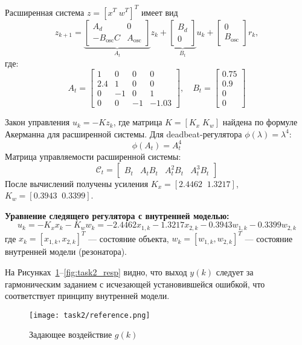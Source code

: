 Расширенная система $z=[x^T\; w^T]^T$ имеет вид
\[
 z_{k+1}= \underbrace{\begin{bmatrix} A_d & 0\\ -B_{\text{osc}} C & A_{\text{osc}}\end{bmatrix}}_{A_t} z_k + \underbrace{\begin{bmatrix} B_d \\ 0 \end{bmatrix}}_{B_t} u_k + \begin{bmatrix}0\\ B_{\text{osc}}\end{bmatrix} r_k,
\]
где:
\[
A_t = \begin{bmatrix}
1 & 0 & 0 & 0\\
2.4 & 1 & 0 & 0\\
0 & -1 & 0 & 1\\
0 & 0 & -1 & -1.03
\end{bmatrix},\quad B_t = \begin{bmatrix}0.75\\ 0.9\\ 0\\ 0\end{bmatrix}
\]

Закон управления $u_k=-K z_k$, где матрица $K=[K_x\;K_w]$ найдена по формуле Акерманна для расширенной системы. Для deadbeat-регулятора $\phi(\lambda)=\lambda^4$:
\[
\phi(A_t) = A_t^4
\]
Матрица управляемости расширенной системы:
\[
\mathcal C_t = \begin{bmatrix}B_t & A_t B_t & A_t^2 B_t & A_t^3 B_t\end{bmatrix}
\]
После вычислений получены усиления $K_x=[2.4462\;\;1.3217]$, $K_w=[0.3943\;\;0.3399]$.

\textbf{Уравнение следящего регулятора с внутренней моделью:}
\[
u_k = -K_x x_k - K_w w_k = -2.4462 x_{1,k} - 1.3217 x_{2,k} - 0.3943 w_{1,k} - 0.3399 w_{2,k}
\]
где $x_k = [x_{1,k}, x_{2,k}]^T$ — состояние объекта, $w_k = [w_{1,k}, w_{2,k}]^T$ — состояние внутренней модели (резонатора).

На Рисунках~\ref{fig:task2_ref}--\ref{fig:task2_resp} видно, что выход $y(k)$ следует за гармоническим заданием с исчезающей установившейся ошибкой, что соответствует принципу внутренней модели.

\begin{figure}[H]
    \centering
    \texttt{[image: task2/reference.png]}
    \caption{Задающее воздействие $g(k)$}
    \label{fig:task2_ref}
\end{figure}

